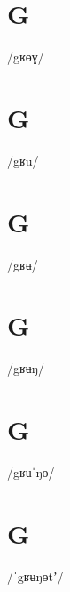 \documentclass[10pt,a4paper,twoside]{book}
\begin{document}
\section*{G}

\begin{multicols}{3}
 {/gʁɵɣ/} {}
\end{multicols}

\section*{G}

\begin{multicols}{3}
 {/gʁu/} {}
\end{multicols}

\section*{G}

\begin{multicols}{3}
 {/gʁʉ/} {}
\end{multicols}

\section*{G}

\begin{multicols}{3}
 {/gʁʉŋ/} {}
\end{multicols}

\section*{G}

\begin{multicols}{3}
 {/gʁʉˈŋɵ/} {}
\end{multicols}

\section*{G}

\begin{multicols}{3}
 {/ˈgʁʉŋɵtʼ/} {}
\end{multicols}
\end{document}

